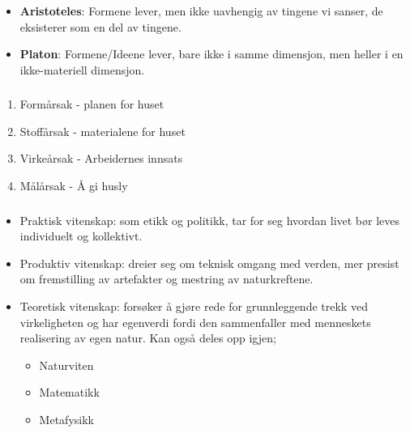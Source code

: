 \documentclass[a4paper]{IEEEtran}
\begin{document}
        \begin{itemize}
            \item \textbf{Aristoteles}: Formene lever, men ikke uavhengig av tingene
            vi sanser, de eksisterer som en del av tingene.
            \item \textbf{Platon}: Formene/Ideene lever, bare ikke i samme dimensjon, men 
            heller i en ikke-materiell dimensjon.
        \end{itemize}

        \subsubsection{} 
        \begin{enumerate}
            \item Formårsak - planen for huset
            \item Stoffårsak - materialene for huset
            \item Virkeårsak - Arbeidernes innsats
            \item Målårsak - Å gi husly
        \end{enumerate} \cite{rephefte_aristoteles} \medskip
        \subsubsection{}
        \begin{itemize} 
            \item Praktisk vitenskap: som etikk og politikk, tar for seg 
            hvordan livet bør leves individuelt og kollektivt.
            \item Produktiv vitenskap: dreier seg om teknisk omgang med verden, mer 
            presist om fremstilling av artefakter og mestring av naturkreftene.
            \item Teoretisk vitenskap: forsøker å gjøre rede for grunnleggende 
            trekk ved virkeligheten og har egenverdi fordi den sammenfaller
            med menneskets realisering av egen natur. Kan også deles opp igjen;
            \begin{itemize}
                \item Naturviten
                \item Matematikk 
                \item Metafysikk
            \end{itemize}
        \end{itemize} \cite{rephefte_aristoteles} \medskip 
\end{document}
